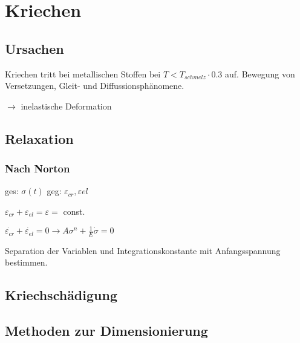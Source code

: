 \section{Kriechen}
    \subsection{Ursachen}
        Kriechen tritt bei metallischen Stoffen bei $ T < T_{schmelz} \cdot 0.3  $ auf.
        Bewegung von Versetzungen, Gleit- und Diffussionsphänomene. 
        
        $\rightarrow$ inelastische Deformation  
        
    \subsection{Relaxation}
        \subsubsection{Nach Norton}
            ges: $\sigma(t)$ geg: $\varepsilon_{cr}, \varepsilon{el}$
        
            $\varepsilon_{cr} + \varepsilon_{el} = \varepsilon = $ const.
            
            $\dot{\varepsilon_{cr}} + \dot{\varepsilon_{el}} = 0 \rightarrow A\sigma^n + \frac{1}{E}\dot{\sigma} = 0$ 
            
            Separation der Variablen und Integrationskonstante mit Anfangsspannung bestimmen.
    \subsection{Kriechschädigung}
            \TODO{}
    
    \subsection{Methoden zur Dimensionierung}
        
\TODO{}